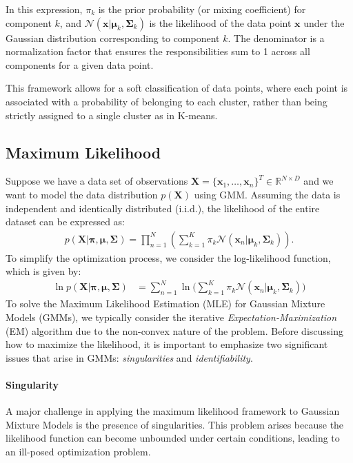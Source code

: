 In this expression, \( \pi_k \) is the prior probability (or mixing coefficient) for component \( k \), and \( \mathcal{N}(\mathbf{x} | \boldsymbol{\mu}_k, \boldsymbol{\Sigma}_k) \) is the likelihood of the data point \( \mathbf{x} \) under the Gaussian distribution corresponding to component \( k \). The denominator is a normalization factor that ensures the responsibilities sum to 1 across all components for a given data point.

This framework allows for a soft classification of data points, where each point is associated with a probability of belonging to each cluster, rather than being strictly assigned to a single cluster as in K-means.

\subsection{Maximum Likelihood}
Suppose we have a data set of observations $\mathbf{X}=\{\mathbf{x}_1,\dots,\mathbf{x}_n\}^{T}\in\mathbb{R}^{N\times D}$ and we want to model the data distribution $p(\mathbf{X})$ using GMM. Assuming the data is independent and identically distributed (i.i.d.), the likelihood of the entire dataset can be expressed as:
\begin{align*}
	p(\mathbf{X}|\boldsymbol{\pi},\boldsymbol{\mu},\boldsymbol{\Sigma}) =\prod_{n=1}^{N}\left(\sum_{k=1}^{K}\pi_k\mathcal{N}(\mathbf{x}_n|\boldsymbol{\mu}_k, \boldsymbol{\Sigma}_k)\right).
\end{align*}
To simplify the optimization process, we consider the log-likelihood function, which is given by:
\begin{align*}
	\ln p(\mathbf{X}|\boldsymbol{\pi},\boldsymbol{\mu},\boldsymbol{\Sigma}) &= \sum_{n=1}^{N}\ln \Bigg(\sum_{k=1}^{K}\pi_k\mathcal{N}(\mathbf{x}_n|\boldsymbol{\mu}_k, \boldsymbol{\Sigma}_k)\Bigg)
\end{align*}
To solve the Maximum Likelihood Estimation (MLE) for Gaussian Mixture Models (GMMs), we typically consider the iterative \textit{Expectation-Maximization} (EM) algorithm due to the non-convex nature of the problem. Before discussing how to maximize the likelihood, it is important to emphasize two significant issues that arise in GMMs: \textit{singularities} and \textit{identifiability}.

\paragraph{Singularity} A major challenge in applying the maximum likelihood framework to Gaussian Mixture Models is the presence of singularities. This problem arises because the likelihood function can become unbounded under certain conditions, leading to an ill-posed optimization problem.

